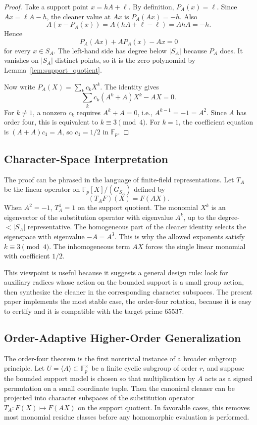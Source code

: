 \documentclass[a4paper,runningheads]{llncs}
\newcommand{\Fp}{\mathbb{F}_p}
\begin{document}
\begin{proof}
Take a support point $x=hA+\ell$.  By definition, $P_A(x)=\ell$.  Since
$Ax=\ell A-h$, the cleaner value at $Ax$ is $P_A(Ax)=-h$.  Also
\[
  A(x-P_A(x))=A(hA+\ell-\ell)=AhA=-h.
\]
Hence
\[
  P_A(Ax)+A P_A(x)-Ax=0
\]
for every $x\in S_A$.  The left-hand side has degree below $|S_A|$ because
$P_A$ does.  It vanishes on $|S_A|$ distinct points, so it is the zero
polynomial by Lemma~\ref{lem:support_quotient}.

Now write $P_A(X)=\sum_k c_kX^k$.  The identity gives
\[
  \sum_k c_k(A^k+A)X^k-AX=0.
\]
For $k\ne1$, a nonzero $c_k$ requires $A^k+A=0$, i.e.,
$A^{k-1}=-1=A^2$.  Since $A$ has order four, this is equivalent to
$k\equiv3\pmod4$.  For $k=1$, the coefficient equation is
$(A+A)c_1=A$, so $c_1=1/2$ in $\Fp$.
\end{proof}

\subsection{Character-Space Interpretation}

The proof can be phrased in the language of finite-field representations.
Let $T_A$ be the linear operator on $\Fp[X]/(G_{S_A})$ defined by
\[
  (T_AF)(X)=F(AX).
\]
When $A^2=-1$, $T_A^4=1$ on the support quotient.  The monomial $X^k$ is an
eigenvector of the substitution operator with eigenvalue $A^k$, up to the
degree-$<|S_A|$ representative.  The homogeneous part of the cleaner identity
selects the eigenspace with eigenvalue $-A=A^3$.  This is why the allowed
exponents satisfy $k\equiv3\pmod4$.  The inhomogeneous term $AX$ forces the
single linear monomial with coefficient $1/2$.

This viewpoint is useful because it suggests a general design rule:
look for auxiliary radices whose action on the bounded support is a small
group action, then synthesize the cleaner in the corresponding character
subspaces.  The present paper implements the most stable case, the order-four
rotation, because it is easy to certify and it is compatible with the target
prime $65537$.


\subsection{Order-Adaptive Higher-Order Generalization}

The order-four theorem is the first nontrivial instance of a broader subgroup
principle.  Let $U=\langle A\rangle\subset\Fp^\times$ be a finite cyclic
subgroup of order $r$, and suppose the bounded support model is chosen so that
multiplication by $A$ acts as a signed permutation on a small coordinate tuple.
Then the canonical cleaner can be projected into character subspaces of the
substitution operator $T_A:F(X)\mapsto F(AX)$ on the support quotient.  In
favorable cases, this removes most monomial residue classes before any
homomorphic evaluation is performed.
\end{document}
